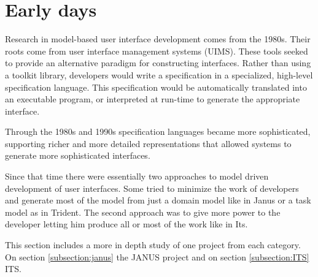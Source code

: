 \section{Early days}
\label{section:early_days}

Research in model-based user interface development comes from the 1980s\cite{SzekelyRetrospective}. Their roots come from user interface management systems (UIMS)\cite{MyersUIMS}. These tools seeked to provide an alternative paradigm for constructing interfaces. Rather than using a toolkit library, developers would write a specification in a specialized, high-level specification language. This specification would be automatically translated into an executable program, or interpreted at run-time to generate the appropriate interface.

Through the 1980s and 1990s specification languages became more sophisticated, supporting richer and more detailed representations that allowed systems to generate more sophisticated interfaces.

Since that time there were essentially two approaches to model driven development of user interfaces. Some tried to minimize the work of developers and generate most of the model from just a domain model like in Janus\cite{janus} or a task model as in Trident\cite{trident1, trident2}. The second approach was to give more power to the developer letting him produce all or most of the work like in Its\cite{ITS}.

This section includes a more in depth study of one project from each category. On section \ref{subsection:janus} the JANUS project and on section \ref{subsection:ITS} ITS.



